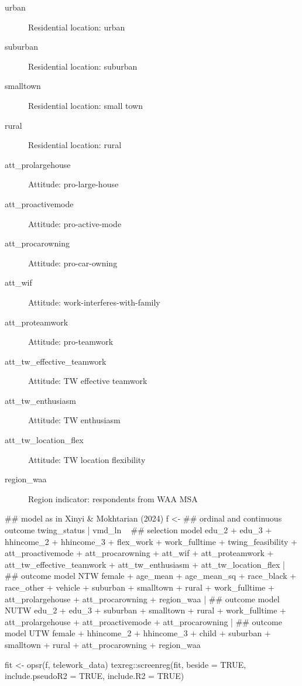\begin{Format}
\begin{description}
\item[urban] Residential location: urban
\item[suburban] Residential location: suburban
\item[smalltown] Residential location: small town
\item[rural] Residential location: rural
\item[att\_prolargehouse] Attitude: pro-large-house
\item[att\_proactivemode] Attitude: pro-active-mode
\item[att\_procarowning] Attitude: pro-car-owning
\item[att\_wif] Attitude: work-interferes-with-family
\item[att\_proteamwork] Attitude: pro-teamwork
\item[att\_tw\_effective\_teamwork] Attitude: TW effective teamwork
\item[att\_tw\_enthusiasm] Attitude: TW enthusiasm
\item[att\_tw\_location\_flex] Attitude: TW location flexibility
\item[region\_waa] Region indicator: respondents from WAA MSA

\end{description}

\end{Format}
%
\begin{References}
\end{References}
%
\begin{Examples}
\begin{ExampleCode}


## model as in Xinyi & Mokhtarian (2024)
f <-
  ## ordinal and continuous outcome
  twing_status | vmd_ln ~
  ## selection model
  edu_2 + edu_3 + hhincome_2 + hhincome_3 +
  flex_work + work_fulltime + twing_feasibility +
  att_proactivemode + att_procarowning +
  att_wif + att_proteamwork +
  att_tw_effective_teamwork + att_tw_enthusiasm + att_tw_location_flex |
  ## outcome model NTW
  female + age_mean + age_mean_sq +
  race_black + race_other +
  vehicle + suburban + smalltown + rural +
  work_fulltime +
  att_prolargehouse + att_procarowning +
  region_waa |
  ## outcome model NUTW
  edu_2 + edu_3 + suburban + smalltown + rural +
  work_fulltime +
  att_prolargehouse + att_proactivemode + att_procarowning |
  ## outcome model UTW
  female + hhincome_2 + hhincome_3 +
  child + suburban + smalltown + rural +
  att_procarowning +
  region_waa

fit <- opsr(f, telework_data)
texreg::screenreg(fit, beside = TRUE, include.pseudoR2 = TRUE,
                  include.R2 = TRUE)


\end{ExampleCode}
\end{Examples}

